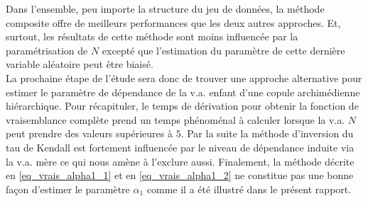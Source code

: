 \documentclass[11pt]{article}
\begin{document}
		 Dans l'ensemble, peu importe la structure du jeu de données, la méthode composite offre de meilleurs performances que les deux autres approches. Et, surtout, les résultats de cette méthode sont moins influencée par la paramétrisation de $N$ excepté que l'estimation du paramètre de cette dernière variable aléatoire peut être biaisé.\\
		 
		 La prochaine étape de l'étude sera donc de trouver une approche alternative pour estimer le paramètre de dépendance de la v.a. enfant d'une copule archimédienne hiérarchique. Pour récapituler, le temps de dérivation pour obtenir la fonction de vraisemblance complète prend un temps phénoménal à calculer lorsque la v.a. $N$ peut prendre des valeurs supérieures à $5$. Par la suite la méthode d'inversion du tau de Kendall est fortement influencée par le niveau de dépendance induite via la v.a. mère ce qui nous amène à l'exclure aussi. Finalement, la méthode décrite en \eqref{eq_vrais_alpha1_1} et en \eqref{eq_vrais_alpha1_2} ne constitue pas une bonne façon d'estimer le paramètre $\alpha_{1}$ comme il a été illustré dans le présent rapport.
 	

	\newpage
	
	
	
\end{document}

